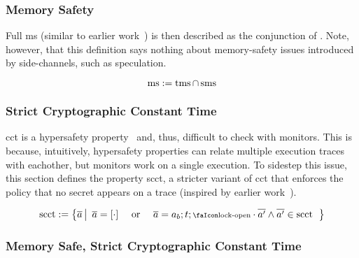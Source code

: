 \documentclass[utf8,acmsmall,review,screen,dvipsnames,anonymous]{acmart}
\begin{document}
\subsubsection{Memory Safety}

Full \gls*{ms} (similar to earlier work~\cite{nagarakatte2009soft,nagarakatte2010cets,jim2002cyclone,necula2005ccured,michael2023mswasm}) is then described as the conjunction of .
Note, however, that this definition says nothing about memory-safety issues introduced by side-channels, such as speculation.

\begin{definition}[\glsfirst*{ms}]\label{def:trace:msdef}
  $$
  \operatorname{ms}:=\operatorname{tms} \cap \operatorname{sms}
  $$
\end{definition}

\subsubsection{Strict Cryptographic Constant Time}

\gls*{cct} is a hypersafety property~\cite{barthe2018sec} and, thus, difficult to check with monitors.
This is because, intuitively, hypersafety properties can relate multiple execution traces with eachother, but monitors work on a single execution.
To sidestep this issue, this section defines the property \gls*{scct}, a stricter variant of \gls*{cct} that enforces the policy that no secret appears on a trace (inspired by earlier work~\cite{almeida2017jasmin}).

\begin{definition}\label{def:trace:scctdef}
  $$
  \scctsafe:=\left\{\trace \left|\begin{array}{rcl}
                                   \trace=\hole{\cdot} & \text{ or } & \trace=\event[_{b}];\sandboxtag;\unlock\cdot\trace['] \wedge \trace[']\in\scctsafe
                                 \end{array}\right.\right\}
  $$
\end{definition}

\subsubsection{Memory Safe, Strict Cryptographic Constant Time}
\end{document}
